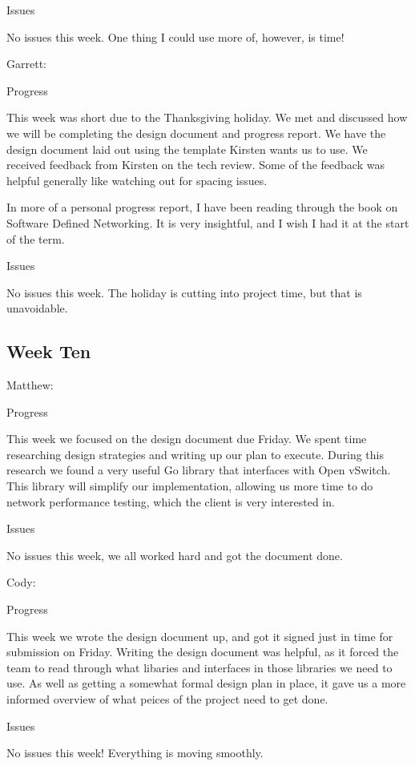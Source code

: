 \documentclass[10pt,onecolumn,journal,draftclsnofoot]{IEEEtran}
\begin{document}
Issues

No issues this week. One thing I could use more of, however, is time!

Garrett:

Progress

This week was short due to the Thanksgiving holiday. We met and discussed how we
will be completing the design document and progress report. We have the design
document laid out using the template Kirsten wants us to use. We received
feedback from Kirsten on the tech review. Some of the feedback was helpful
generally like watching out for spacing issues.

In more of a personal progress report, I have been reading through the book on
Software Defined Networking. It is very insightful, and I wish I had it at the
start of the term.

Issues

No issues this week. The holiday is cutting into project time, but that is
unavoidable.

\subsection{Week Ten}

Matthew:

Progress

This week we focused on the design document due Friday. We spent time
researching design strategies and writing up our plan to execute. During this
research we found a very useful Go library that interfaces with Open vSwitch.
This library will simplify our implementation, allowing us more time to do
network performance testing, which the client is very interested in.

Issues

No issues this week, we all worked hard and got the document done.

Cody:

Progress

This week we wrote the design document up, and got it signed just in time for
submission on Friday. Writing the design document was helpful, as it forced the
team to read through what libaries and interfaces in those libraries we need to
use. As well as getting a somewhat formal design plan in place, it gave us a
more informed overview of what peices of the project need to get done.

Issues

No issues this week! Everything is moving smoothly.
\end{document}

